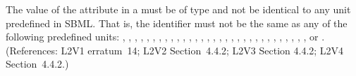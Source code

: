 The value of the  attribute in a \UnitDefinition must be of
type  and not be
identical to any unit predefined in SBML.  That is, the identifier
must not be the same as any of the following predefined units:
,
,
,
,
,
,
,
,
,
,
,
,
,
,
,
,
,
,
,
,
,
,
,
,
,
,
,
,
,
,
, or
.
(References: L2V1 erratum~14; L2V2 Section~4.4.2; L2V3 Section 4.4.2; L2V4 Section~4.4.2.)

